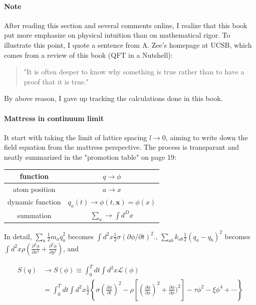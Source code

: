 \documentclass{book}
\numberwithin{equation}{subsection} %
\theoremstyle{definition}
\begin{document}
\paragraph{Note} After reading this section and several comments online,
I realize that this book put more emphasize on physical
intuition than on mathematical rigor. To illustrate this point, I
quote a sentence from A. Zee's homepage at UCSB, which comes from
a review of this book (QFT in a Nutshell):

\begin{quote}
    "It is often deeper to know why something is true rather than to have a proof that it is true."
\end{quote}

By above reason, I gave up tracking the calculations done in this
book.

\paragraph{Mattress in continuum limit} It start with taking the
limit of lattice spacing $l\to 0$, aiming to write down the field
equation from the mattress perspective. The process is transparant
and neatly summarized in the "promotion table" on page 19:

\begin{center}
\begin{tabular}{| c | c |}
    \hline
    function  & $q\to \phi$  \\
    \hline
    atom position  & \(a\to x\)  \\
    \hline
    dynamic function  & \(q_a(t) \to \phi(t,\mathbf{x})=\phi(x)\)  \\
    \hline
    summation  & \(\sum_a \to \int d^D x\)  \\
    \hline
\end{tabular}
\end{center}

In detail, $\sum_a \frac{1}{2} m_a\dot{q}_a^2$ becomes 
$\int d^2x \frac{1}{2} \sigma (\partial \phi/\partial t)^2$.,
$\sum_{ab} k_{ab} \frac{1}{2} (q_a-q_b)^2$ becomes
$\int d^2x \rho( \frac{\partial^2 \phi}{\partial x^2}
    + \frac{\partial^2 \phi}{\partial y^2})$, and

\begin{align}
    S(q) &\to S(\phi) \equiv \int_0^T dt \int d^2x \mathcal{L}(\phi)
    \nonumber \\
    &= \int_0^T dt \int d^2x \frac{1}{2}
    \left\lbrace \sigma ( \frac{\partial \phi}{\partial t})^2
    -\rho \left[ ( \frac{\partial \phi}{\partial x})^2 +
        \frac{\partial \phi}{\partial x})^2 \right]
    -\tau\phi^2 -\xi\phi^4 +\cdots \right\rbrace
\end{align}
\end{document}
